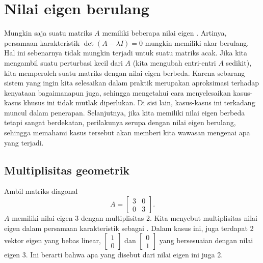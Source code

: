 
\sectionnewpage
\section{Nilai eigen berulang} \label{sec:multeigen}



Mungkin saja suatu matriks $A$ memiliki beberapa nilai eigen .
Artinya, persamaan karakteristik $\det(A-\lambda I) = 0$ mungkin memiliki
akar berulang.  Hal ini sebenarnya tidak mungkin terjadi
untuk suatu matriks acak.  Jika kita mengambil suatu perturbasi kecil dari $A$ (kita mengubah
entri-entri $A$ sedikit), kita memperoleh suatu matriks dengan nilai eigen berbeda.  Karena
sebarang sistem yang ingin kita selesaikan dalam praktik merupakan aproksimasi terhadap kenyataan
bagaimanapun juga, sehingga mengetahui cara menyelesaikan
kasus-kasus khusus ini tidak mutlak diperlukan.  
Di sisi lain, kasus-kasus ini terkadang muncul dalam penerapan.
Selanjutnya, jika kita memiliki nilai eigen berbeda tetapi sangat berdekatan, perilakunya
serupa dengan nilai eigen berulang, sehingga memahami kasus tersebut
akan memberi kita wawasan mengenai apa yang terjadi.

\subsection{Multiplisitas geometrik}

Ambil matriks diagonal
\begin{equation*}
A =
\begin{bmatrix}
3 & 0 \\ 0 & 3
\end{bmatrix} .
\end{equation*}
$A$ memiliki nilai eigen 3 dengan multiplisitas 2.  Kita menyebut
multiplisitas nilai eigen
dalam persamaan karakteristik sebagai
\emph{}.  Dalam kasus ini, juga terdapat 2
vektor eigen yang
bebas linear,
$\left[ \begin{smallmatrix} 1 \\ 0 \end{smallmatrix} \right]$
dan
$\left[ \begin{smallmatrix} 0 \\ 1 \end{smallmatrix} \right]$ yang bersesuaian
dengan nilai eigen 3.  Ini berarti
bahwa apa yang disebut \emph{}
dari nilai eigen ini juga 2.

